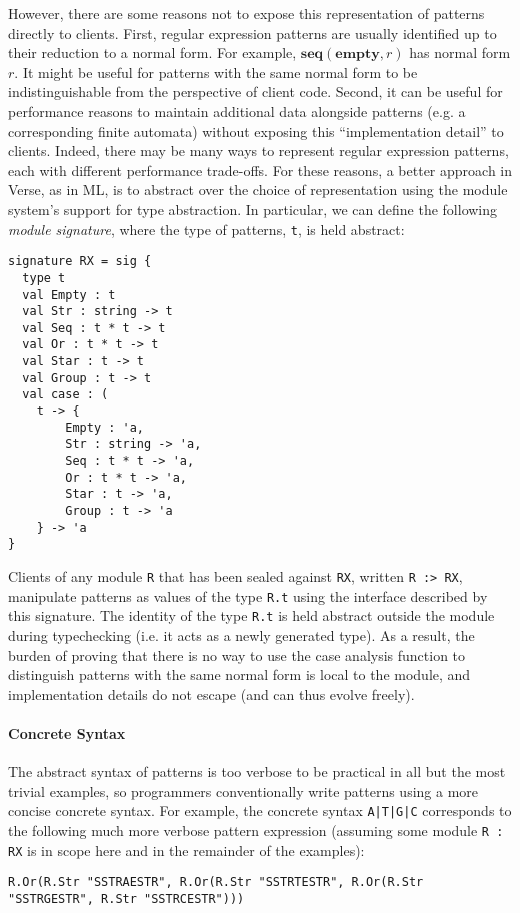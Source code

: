 However, there are some reasons not to expose this representation of patterns directly to clients. First, regular expression patterns are usually identified up to their reduction to a normal form. For example, $\textbf{seq}(\textbf{empty}, r)$ has normal form $r$. It might be useful for patterns with the same normal form to be  indistinguishable from the perspective of client code. Second, it can be useful for performance reasons to maintain additional data alongside patterns (e.g. a corresponding finite automata) without exposing this ``implementation detail'' to clients. Indeed, there may be many ways to represent regular expression patterns, each with different performance trade-offs. For these reasons, a better approach in Verse, as in ML, is to abstract over the choice of representation using  the module system's support for type abstraction. In particular, we can define the following \emph{module signature}, where the type of patterns, \lstinline{t}, is held abstract:

\begin{lstlisting}[deletekeywords={case},numbers=none]
signature RX = sig {
  type t
  val Empty : t
  val Str : string -> t
  val Seq : t * t -> t
  val Or : t * t -> t
  val Star : t -> t
  val Group : t -> t
  val case : (
    t -> {
    	Empty : 'a,
    	Str : string -> 'a,
    	Seq : t * t -> 'a,
    	Or : t * t -> 'a,
    	Star : t -> 'a,
    	Group : t -> 'a
    } -> 'a
}
\end{lstlisting}
 Clients of any module \lstinline{R} that has been sealed against \lstinline{RX}, written \lstinline{R :> RX}, manipulate patterns as values of the type \verb|R.t| using the interface described by this signature. The identity of the type \lstinline{R.t} is held abstract outside the module during typechecking (i.e. it acts as a newly generated type). As a result, the burden of proving that there is no way to use the case analysis function to distinguish patterns with the same normal form is local to the module, and implementation details do not escape (and can thus evolve freely). %

\paragraph{Concrete Syntax} The abstract syntax of patterns is too verbose to be practical  in all but the most trivial examples, so programmers conventionally write patterns using a more concise concrete syntax. For example, the concrete syntax \lstinline{A|T|G|C} corresponds to the following much more verbose pattern expression (assuming some module \lstinline{R : RX} is in scope here and in the remainder of the examples):
\begin{lstlisting}[numbers=none,mathescape=|]
R.Or(R.Str "SSTRAESTR", R.Or(R.Str "SSTRTESTR", R.Or(R.Str "SSTRGESTR", R.Str "SSTRCESTR")))
\end{lstlisting} 




